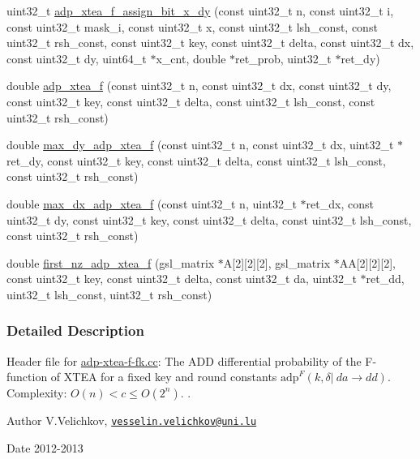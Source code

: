 \begin{DoxyCompactItemize}
\item 
uint32\-\_\-t \hyperlink{adp-xtea-f-fk_8hh_a51b9a2096d1bb092bd775e5cbf1227da}{adp\-\_\-xtea\-\_\-f\-\_\-assign\-\_\-bit\-\_\-x\-\_\-dy} (const uint32\-\_\-t n, const uint32\-\_\-t i, const uint32\-\_\-t mask\-\_\-i, const uint32\-\_\-t x, const uint32\-\_\-t lsh\-\_\-const, const uint32\-\_\-t rsh\-\_\-const, const uint32\-\_\-t key, const uint32\-\_\-t delta, const uint32\-\_\-t dx, const uint32\-\_\-t dy, uint64\-\_\-t $\ast$x\-\_\-cnt, double $\ast$ret\-\_\-prob, uint32\-\_\-t $\ast$ret\-\_\-dy)
\item 
double \hyperlink{adp-xtea-f-fk_8hh_af678f1852341d1a0f4111299fd24f5d8}{adp\-\_\-xtea\-\_\-f} (const uint32\-\_\-t n, const uint32\-\_\-t dx, const uint32\-\_\-t dy, const uint32\-\_\-t key, const uint32\-\_\-t delta, const uint32\-\_\-t lsh\-\_\-const, const uint32\-\_\-t rsh\-\_\-const)
\item 
double \hyperlink{adp-xtea-f-fk_8hh_abbb74922432f62fb3a99b14895c1c4a9}{max\-\_\-dy\-\_\-adp\-\_\-xtea\-\_\-f} (const uint32\-\_\-t n, const uint32\-\_\-t dx, uint32\-\_\-t $\ast$ret\-\_\-dy, const uint32\-\_\-t key, const uint32\-\_\-t delta, const uint32\-\_\-t lsh\-\_\-const, const uint32\-\_\-t rsh\-\_\-const)
\item 
double \hyperlink{adp-xtea-f-fk_8hh_adfcacb279757491adf287170fbd52dfa}{max\-\_\-dx\-\_\-adp\-\_\-xtea\-\_\-f} (const uint32\-\_\-t n, uint32\-\_\-t $\ast$ret\-\_\-dx, const uint32\-\_\-t dy, const uint32\-\_\-t key, const uint32\-\_\-t delta, const uint32\-\_\-t lsh\-\_\-const, const uint32\-\_\-t rsh\-\_\-const)
\item 
double \hyperlink{adp-xtea-f-fk_8hh_afcd00d5c1a88acce22eb6dbf61ee7624}{first\-\_\-nz\-\_\-adp\-\_\-xtea\-\_\-f} (gsl\-\_\-matrix $\ast$\-A\mbox{[}2\mbox{]}\mbox{[}2\mbox{]}\mbox{[}2\mbox{]}, gsl\-\_\-matrix $\ast$\-A\-A\mbox{[}2\mbox{]}\mbox{[}2\mbox{]}\mbox{[}2\mbox{]}, const uint32\-\_\-t key, const uint32\-\_\-t delta, const uint32\-\_\-t da, uint32\-\_\-t $\ast$ret\-\_\-dd, uint32\-\_\-t lsh\-\_\-const, uint32\-\_\-t rsh\-\_\-const)
\end{DoxyCompactItemize}


\subsubsection{\-Detailed \-Description}
\-Header file for \hyperlink{adp-xtea-f-fk_8cc}{adp-\/xtea-\/f-\/fk.\-cc}\-: \-The \-A\-D\-D differential probability of the \-F-\/function of \-X\-T\-E\-A for a fixed key and round constants $\mathrm{adp}^{F}(k, \delta |~ da \rightarrow dd)$. \-Complexity\-: $ O(n) < c \le O(2^n) $. . \begin{DoxyAuthor}{\-Author}
\-V.\-Velichkov, \href{mailto:vesselin.velichkov@uni.lu}{\tt vesselin.\-velichkov@uni.\-lu} 
\end{DoxyAuthor}
\begin{DoxyDate}{\-Date}
2012-\/2013 
\end{DoxyDate}



